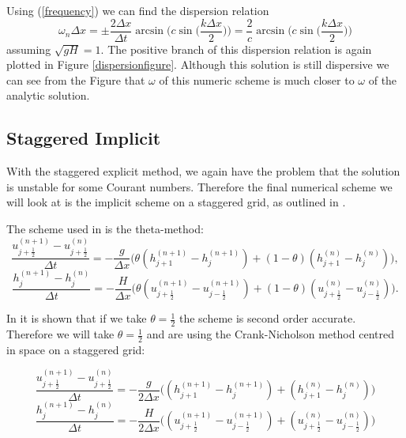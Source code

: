 \documentclass[a4paper,12pt, notitlepage]{article}
\begin{document}
Using (\ref{frequency}) we can find the dispersion relation
\begin{equation}
	\omega_{n} \Delta x = \pm\frac{2\Delta x}{\Delta t} \arcsin\bigg(c\sin\bigg(\frac{k\Delta x}{2}\bigg)\bigg) = \frac{2}{c} \arcsin\bigg(c\sin\bigg(\frac{k\Delta x}{2}\bigg)\bigg) 
\end{equation}
assuming $\sqrt{gH} = 1$. The positive branch of this dispersion relation is again plotted in Figure \ref{dispersionfigure}. Although this solution is still dispersive we can see from the Figure that $\omega$ of this numeric scheme is much closer to $\omega$ of the analytic solution.

\subsection{Staggered Implicit}
With the staggered explicit method, we again have the problem that the solution is unstable for some Courant numbers. Therefore the final numerical scheme we will look at is the implicit scheme on a staggered grid, as outlined in \cite{implicit}.

The scheme used in \cite{implicit} is the theta-method:
\begin{equation}
\frac{u_{j + \frac{1}{2}}^{(n + 1)} - u_{j + \frac{1}{2}}^{(n)}}{\Delta t} = -\frac{g}{\Delta x} \bigg(\theta (h_{j + 1}^{(n+ 1)} - h_{j}^{(n+ 1)}) + (1 - \theta) (h_{j + 1}^{(n)} - h_{j}^{(n)})\bigg),
\end{equation}
\begin{equation}
\frac{h_{j}^{(n + 1)} - h_{j}^{(n)}}{\Delta t} = -\frac{H}{\Delta x} \bigg(\theta (u_{j + \frac{1}{2}}^{(n+ 1)} - u_{j - \frac{1}{2}}^{(n+ 1)}) + (1 - \theta) (u_{j + \frac{1}{2}}^{(n)} - u_{j - \frac{1}{2}}^{(n)})\bigg).
\end{equation}

In \cite{implicit} it is shown that if we take $\theta = \frac{1}{2}$ the scheme is second order accurate. Therefore we will take $\theta = \frac{1}{2}$ and are using the Crank-Nicholson method centred in space on a staggered grid:

\begin{equation}\label{semiimplicit1}
\frac{u_{j + \frac{1}{2}}^{(n + 1)} - u_{j + \frac{1}{2}}^{(n)}}{\Delta t} = -\frac{g}{2\Delta x} \bigg((h_{j + 1}^{(n+ 1)} - h_{j}^{(n+ 1)}) + (h_{j + 1}^{(n)} - h_{j}^{(n)})\bigg)
\end{equation}
\begin{equation}\label{semiimplicit2}
\frac{h_{j}^{(n + 1)} - h_{j}^{(n)}}{\Delta t} = -\frac{H}{2\Delta x} \bigg((u_{j + \frac{1}{2}}^{(n+ 1)} - u_{j - \frac{1}{2}}^{(n+ 1)}) + (u_{j + \frac{1}{2}}^{(n)} - u_{j - \frac{1}{2}}^{(n)})\bigg)
\end{equation}
\end{document}
